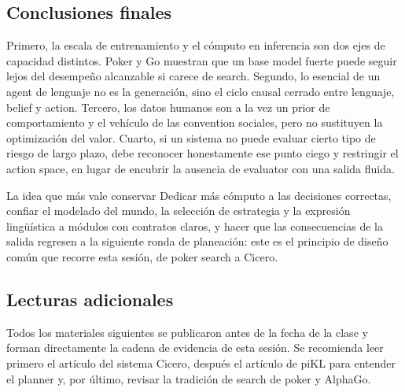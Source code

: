 \subsection{Conclusiones finales}

Primero, la escala de entrenamiento y el cómputo en inferencia son dos ejes de capacidad distintos. Poker y Go muestran que un base model fuerte puede seguir lejos del desempeño alcanzable si carece de search. Segundo, lo esencial de un agent de lenguaje no es la generación, sino el ciclo causal cerrado entre lenguaje, belief y action. Tercero, los datos humanos son a la vez un prior de comportamiento y el vehículo de las convention sociales, pero no sustituyen la optimización del valor. Cuarto, si un sistema no puede evaluar cierto tipo de riesgo de largo plazo, debe reconocer honestamente ese punto ciego y restringir el action space, en lugar de encubrir la ausencia de evaluator con una salida fluida.

\begin{importantbox}{La idea que más vale conservar}
Dedicar más cómputo a las decisiones correctas, confiar el modelado del mundo, la selección de estrategia y la expresión lingüística a módulos con contratos claros, y hacer que las consecuencias de la salida regresen a la siguiente ronda de planeación: este es el principio de diseño común que recorre esta sesión, de poker search a Cicero.
\end{importantbox}

\subsection{Lecturas adicionales}

Todos los materiales siguientes se publicaron antes de la fecha de la clase y forman directamente la cadena de evidencia de esta sesión. Se recomienda leer primero el artículo del sistema Cicero, después el artículo de piKL para entender el planner y, por último, revisar la tradición de search de poker y AlphaGo.

